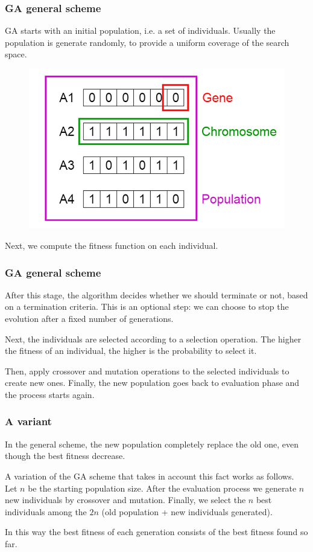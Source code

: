 \documentclass{beamer}
\begin{document}
	\begin{frame}
		\frametitle{GA general scheme}
		GA starts with an initial population, i.e. a set of individuals. Usually the population is generate randomly, to provide a uniform coverage of the search space.
		
		\begin{figure}
			\centering
			\includegraphics[scale=0.3]{images/ga_pop}
		\end{figure}
		Next, we compute the fitness function on each individual.
	\end{frame}

	\begin{frame}
		\frametitle{GA general scheme}
		After this stage, the algorithm decides whether we should terminate or not, based on a termination criteria. This is an optional step: we can choose to stop the evolution after a fixed number of generations.
		
		\vspace{5mm}
		
		Next, the individuals are selected according to a selection operation. The higher the fitness of an individual, the higher is the probability to select it.
		
		\vspace{5mm}
		
		Then, apply crossover and mutation operations to the selected individuals to create new ones. Finally, the new population goes back to evaluation phase and the process starts again.
	\end{frame}

	\begin{frame}
		\frametitle{A variant}
		In the general scheme, the new population completely replace the old one, even though the best fitness decrease.
		
		\vspace{5mm}
		
		A variation of the GA scheme that takes in account this fact works as follows. Let $n$ be the starting population size. After the evaluation process we generate $n$ new individuals by crossover and mutation. Finally, we select the $n$ best individuals among the $2n$ (old population + new individuals generated).
		
		\vspace{5mm}
		
		In this way the best fitness of each generation consists of the best fitness found so far. 
	\end{frame}
\end{document}
